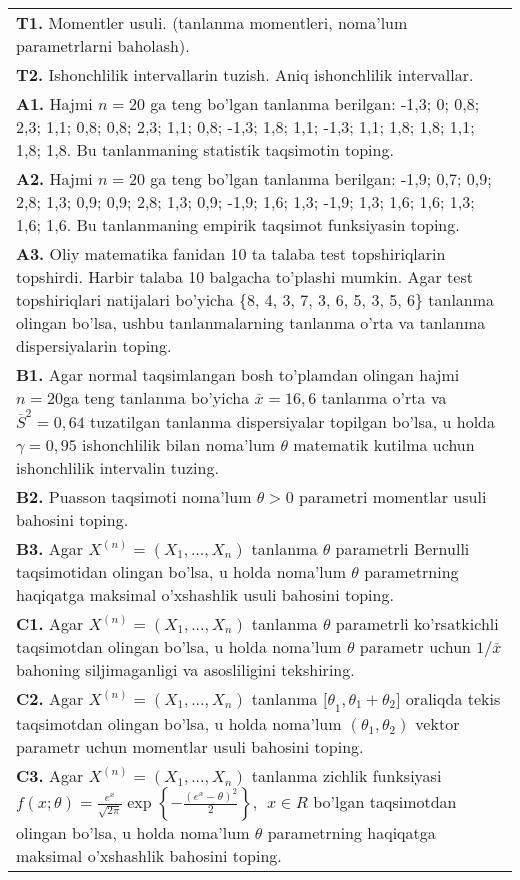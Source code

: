 \documentclass{article}
\begin{document}
\begin{tabular}{m{17cm}}
\textbf{T1.} 
Momentler usuli. (tanlanma momentleri, noma'lum parametrlarni baholash).
\\
\textbf{T2.} 
Ishonchlilik intervallarin tuzish. Aniq ishonchlilik intervallar.
\\
\textbf{A1.} 
Hajmi \(n = 20\) ga teng bo'lgan tanlanma berilgan: -1,3; 0; 0,8; 2,3; 1,1; 0,8; 0,8; 2,3; 1,1; 0,8; -1,3; 1,8; 1,1; -1,3; 1,1; 1,8; 1,8; 1,1; 1,8; 1,8. Bu tanlanmaning statistik taqsimotin toping.
\\
\textbf{A2.} 
Hajmi \(n = 20\) ga teng bo'lgan tanlanma berilgan: -1,9; 0,7; 0,9; 2,8; 1,3; 0,9; 0,9; 2,8; 1,3; 0,9; -1,9; 1,6; 1,3; -1,9; 1,3; 1,6; 1,6; 1,3; 1,6; 1,6. Bu tanlanmaning empirik taqsimot funksiyasin toping.
\\
\textbf{A3.} 
Oliy matematika fanidan 10 ta talaba test topshiriqlarin topshirdi. Harbir talaba 10 balgacha to'plashi mumkin. Agar test topshiriqlari natijalari bo'yicha \{8, 4, 3, 7, 3, 6, 5, 3, 5, 6\} tanlanma olingan bo'lsa, ushbu tanlanmalarning tanlanma o'rta va tanlanma dispersiyalarin toping.
\\
\textbf{B1.} 
Agar normal taqsimlangan bosh to'plamdan olingan hajmi \(n = 20\)ga teng tanlanma bo'yicha \(\overline{x} = 16,6\) tanlanma o'rta va \({\overline{S}}^{2} = 0,64\) tuzatilgan tanlanma dispersiyalar topilgan bo'lsa, u holda \(\gamma = 0,95\) ishonchlilik bilan noma'lum \(\theta\) matematik kutilma uchun ishonchlilik intervalin tuzing.
\\
\textbf{B2.} 
Puasson taqsimoti noma'lum \(\theta > 0\) parametri momentlar usuli bahosini toping.
\\
\textbf{B3.} 
Agar \(X^{(n)} = \left( X_{1},...,X_{n} \right)\) tanlanma \(\theta\) parametrli Bernulli taqsimotidan olingan bo'lsa, u holda noma'lum \(\theta\) parametrning haqiqatga maksimal o'xshashlik usuli bahosini toping.
\\
\textbf{C1.} 
Agar \(X^{(n)} = \left( X_{1},...,X_{n} \right)\) tanlanma \(\theta\) parametrli ko'rsatkichli taqsimotdan olingan bo'lsa, u holda noma'lum \(\theta\) parametr uchun \(1/\overline{x}\) bahoning siljimaganligi va asosliligini tekshiring.
\\
\textbf{C2.} 
Agar \(X^{(n)} = \left( X_{1},...,X_{n} \right)\) tanlanma \({\lbrack\theta}_{1},\theta_{1} + \theta_{2}\rbrack\) oraliqda tekis taqsimotdan olingan bo'lsa, u holda noma'lum \(\left( \theta_{1},\theta_{2} \right)\) vektor parametr uchun momentlar usuli bahosini toping.
\\
\textbf{C3.} 
Agar \(X^{(n)} = \left( X_{1},...,X_{n} \right)\) tanlanma zichlik funksiyasi \(f(x;\theta) = \frac{e^{x}}{\sqrt{2\pi}}\exp\left\{ - \frac{\left( e^{x} - \theta \right)^{2}}{2} \right\},\ \ x \in R\) bo'lgan taqsimotdan olingan bo'lsa, u holda noma'lum \(\theta\) parametrning haqiqatga maksimal o'xshashlik bahosini toping.
\\

\end{tabular}
\vspace{1cm}
\end{document}
